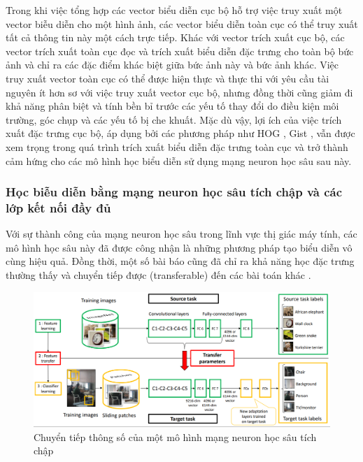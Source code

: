 Trong khi việc tổng hợp các vector biểu diễn cục bộ hỗ trợ việc truy xuất một vector biễu diễn cho một hình ảnh, các vector biểu diễn toàn cục có thể truy xuất tất cả thông tin này một cách trực tiếp. Khác với vector trích xuất cục bộ, các vector trích xuất toàn cục đọc và trích xuất biểu diễn đặc trưng cho toàn bộ bức ảnh và chỉ ra các đặc điểm khác biệt giữa bức ảnh này và bức ảnh khác. Việc truy xuất vector toàn cục có thể được hiện thực và thực thi với yêu cầu tài nguyên ít hơn sơ với việc truy xuất vector cục bộ, nhưng đồng thời cũng giảm đi khả năng phân biệt và tính bền bỉ trước các yếu tố thay đổi do điều kiện môi trường, góc chụp và các yếu tố bị che khuất. Mặc dù vậy, lợi ích của việc trích xuất đặc trưng cục bộ, áp dụng bởi các phương pháp như HOG \cite{HOG}, Gist \cite{GIST}, vẫn được xem trọng trong quá trình trích xuất biểu diễn đặc trưng toàn cục và trở thành cảm hứng cho các mô hình học biểu diễn sử dụng mạng neuron học sâu sau này.

\subsubsection{Học biễu diễn bằng mạng neuron học sâu tích chập và các lớp kết nối đầy đủ}

Với sự thành công của mạng neuron học sâu trong lĩnh vực thị giác máy tính\cite{krizhevsky2012imagenet}, các mô hình học sâu này đã được công nhận là những phương pháp tạo biểu diễn vô cùng hiệu quả. Đồng thời, một số bài báo cũng đã chỉ ra khả năng học đặc trưng thường thấy và chuyển tiếp được (transferable) đến các bài toán khác \cite{Oquab_2014_CVPR,ZeilerVisualizingAU,Chen2018DeepLabSI}.

\begin{figure}[h]
    \centering
    \includegraphics[width=\textwidth]{pics/Chapter2/cnn_transfer.png}
    \caption{Chuyển tiếp thông số của một mô hình mạng neuron học sâu tích chập\cite{Oquab_2014_CVPR}}
\end{figure}

